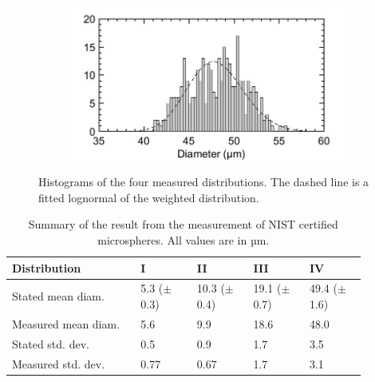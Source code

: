 \begin{figure}[ht]
\begin{subfigure}{.5\textwidth}
  \label{fig:Meas1_20um}
\end{subfigure}
\begin{subfigure}{.49\textwidth}
  \centering
  \includegraphics[width=1\linewidth]{figures/Images/Measurement1_50um}
  \label{fig:Meas1_50um}
\end{subfigure}
\caption{Histograms of the four measured distributions. The dashed line is a fitted  lognormal of the weighted distribution.}
\label{fig:Histograms}
\end{figure}

\begin{table}[ht]
\centering
\begin{tabular}{p{0.32\linewidth} p{0.14\linewidth} p{0.14\linewidth} p{0.14\linewidth} p{0.14\linewidth}}
\hline
\textbf{Distribution} & \textbf{I} & \textbf{II} & \textbf{III} & \textbf{IV}\\
\hline
Stated mean diam. & 5.3\newline \hspace{1em} ($\pm$ 0.3) & 10.3\newline \hspace{1em} ($\pm$ 0.4) & 19.1\newline \hspace{1em} ($\pm$ 0.7) & 49.4\newline \hspace{1em} ($\pm$ 1.6) \\
Measured mean diam. & 5.6 & 9.9 & 18.6 & 48.0 \\
\hline
Stated std. dev. & 0.5 & 0.9 & 1.7 & 3.5 \\
Measured std. dev. & 0.77 & 0.67 & 1.7 & 3.1 \\
\hline
\end{tabular}
\caption{Summary of the result from the measurement of NIST certified microspheres. All values are in µm.}
\label{tab:poly_meas}
\end{table}


